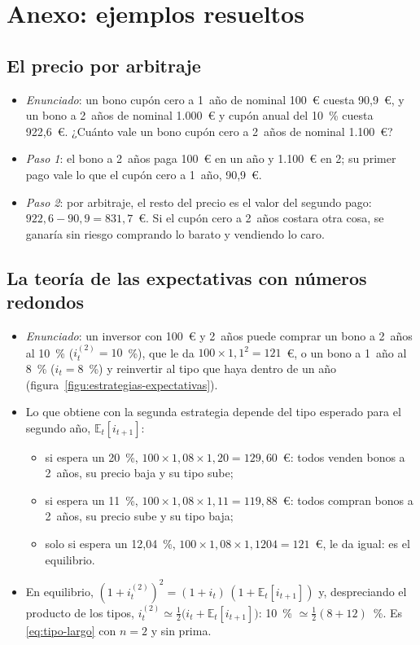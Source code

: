 \documentclass[11pt]{article}
\begin{document}
\section{Anexo: ejemplos resueltos}\label{anexo:ejemplos}

\subsection{El precio por arbitraje}

\begin{itemize}
\item \emph{Enunciado}: un bono cupón cero a 1~año de nominal 100~€ cuesta 90,9~€, y un bono a 2~años de nominal 1.000~€ y cupón anual del 10~\% cuesta 922,6~€. ¿Cuánto vale un bono cupón cero a 2~años de nominal 1.100~€?
\item \emph{Paso 1}: el bono a 2~años paga 100~€ en un año y 1.100~€ en 2; su primer pago vale lo que el cupón cero a 1~año, 90,9~€.
\item \emph{Paso 2}: por arbitraje, el resto del precio es el valor del segundo pago: $922{,}6-90{,}9=831{,}7$~€. Si el cupón cero a 2~años costara otra cosa, se ganaría sin riesgo comprando lo barato y vendiendo lo caro.\findemo
\end{itemize}

\subsection{La teoría de las expectativas con números redondos}

\begin{itemize}
\item \emph{Enunciado}: un inversor con 100~€ y 2~años puede comprar un bono a 2~años al 10~\% ($i^{(2)}_t=10$~\%), que le da $100\times1{,}1^2=121$~€, o un bono a 1~año al 8~\% ($i_t=8$~\%) y reinvertir al tipo que haya dentro de un año (figura~\ref{figu:estrategias-expectativas}).
\item Lo que obtiene con la segunda estrategia depende del tipo esperado para el segundo año, $\mathbb{E}_t[i_{t+1}]$:
  \begin{itemize}
  \item si espera un 20~\%, $100\times1{,}08\times1{,}20=129{,}60$~€: todos venden bonos a 2~años, su precio baja y su tipo sube;
  \item si espera un 11~\%, $100\times1{,}08\times1{,}11=119{,}88$~€: todos compran bonos a 2~años, su precio sube y su tipo baja;
  \item solo si espera un 12,04~\%, $100\times1{,}08\times1{,}1204=121$~€, le da igual: es el equilibrio.
  \end{itemize}
\item En equilibrio, $(1+i^{(2)}_t)^2=(1+i_t)\,(1+\mathbb{E}_t[i_{t+1}])$ y, despreciando el producto de los tipos, $i^{(2)}_t\simeq\frac12\big(i_t+\mathbb{E}_t[i_{t+1}]\big)$: 10~\% $\simeq\frac12(8+12)$~\%. Es \eqref{eq:tipo-largo} con $n=2$ y sin prima.\findemo
\end{itemize}
\end{document}
